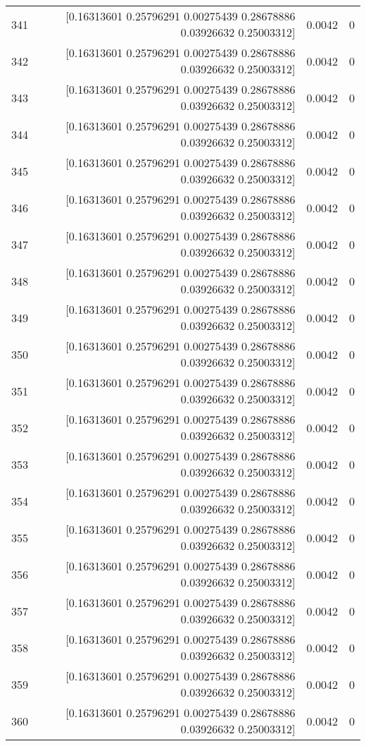 \begin{longtable}{lrrr}
341 & [0.16313601 0.25796291 0.00275439 0.28678886 0.03926632 0.25003312] & 0.0042 & 0 \\
342 & [0.16313601 0.25796291 0.00275439 0.28678886 0.03926632 0.25003312] & 0.0042 & 0 \\
343 & [0.16313601 0.25796291 0.00275439 0.28678886 0.03926632 0.25003312] & 0.0042 & 0 \\
344 & [0.16313601 0.25796291 0.00275439 0.28678886 0.03926632 0.25003312] & 0.0042 & 0 \\
345 & [0.16313601 0.25796291 0.00275439 0.28678886 0.03926632 0.25003312] & 0.0042 & 0 \\
346 & [0.16313601 0.25796291 0.00275439 0.28678886 0.03926632 0.25003312] & 0.0042 & 0 \\
347 & [0.16313601 0.25796291 0.00275439 0.28678886 0.03926632 0.25003312] & 0.0042 & 0 \\
348 & [0.16313601 0.25796291 0.00275439 0.28678886 0.03926632 0.25003312] & 0.0042 & 0 \\
349 & [0.16313601 0.25796291 0.00275439 0.28678886 0.03926632 0.25003312] & 0.0042 & 0 \\
350 & [0.16313601 0.25796291 0.00275439 0.28678886 0.03926632 0.25003312] & 0.0042 & 0 \\
351 & [0.16313601 0.25796291 0.00275439 0.28678886 0.03926632 0.25003312] & 0.0042 & 0 \\
352 & [0.16313601 0.25796291 0.00275439 0.28678886 0.03926632 0.25003312] & 0.0042 & 0 \\
353 & [0.16313601 0.25796291 0.00275439 0.28678886 0.03926632 0.25003312] & 0.0042 & 0 \\
354 & [0.16313601 0.25796291 0.00275439 0.28678886 0.03926632 0.25003312] & 0.0042 & 0 \\
355 & [0.16313601 0.25796291 0.00275439 0.28678886 0.03926632 0.25003312] & 0.0042 & 0 \\
356 & [0.16313601 0.25796291 0.00275439 0.28678886 0.03926632 0.25003312] & 0.0042 & 0 \\
357 & [0.16313601 0.25796291 0.00275439 0.28678886 0.03926632 0.25003312] & 0.0042 & 0 \\
358 & [0.16313601 0.25796291 0.00275439 0.28678886 0.03926632 0.25003312] & 0.0042 & 0 \\
359 & [0.16313601 0.25796291 0.00275439 0.28678886 0.03926632 0.25003312] & 0.0042 & 0 \\
360 & [0.16313601 0.25796291 0.00275439 0.28678886 0.03926632 0.25003312] & 0.0042 & 0 \\

\end{longtable}
